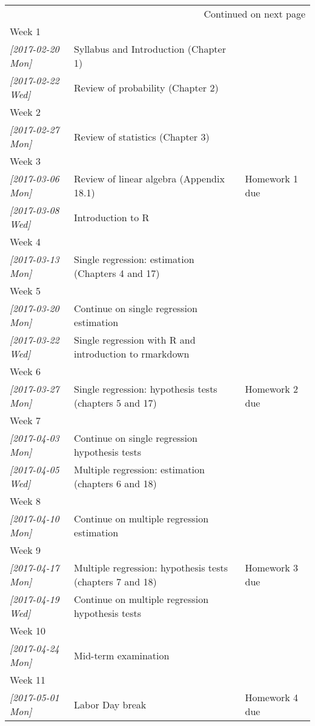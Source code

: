 \documentclass[a4paper,11pt]{article}
\begin{document}
{\begin{longtable}{p{2.8cm}p{9cm}p{2.8cm}}
\hline
\endhead
\hline\multicolumn{3}{r}{Continued on next page} \\
\endfoot
\endlastfoot
\hline
Week 1 &  & \\
\textit{[2017-02-20 Mon]} & Syllabus and Introduction (Chapter 1) & \\
\textit{[2017-02-22 Wed]} & Review of probability (Chapter 2) & \\
\hline
Week 2 &  & \\
\textit{[2017-02-27 Mon]} & Review of statistics (Chapter 3) & \\
\hline
Week 3 &  & \\
\textit{[2017-03-06 Mon]} & Review of linear algebra (Appendix 18.1) & Homework 1 due\\
\textit{[2017-03-08 Wed]} & Introduction to R & \\
\hline
Week 4 &  & \\
\textit{[2017-03-13 Mon]} & Single regression: estimation (Chapters 4 and 17) & \\
\hline
Week 5 &  & \\
\textit{[2017-03-20 Mon]} & Continue on single regression estimation & \\
\textit{[2017-03-22 Wed]} & Single regression with R and introduction to rmarkdown & \\
\hline
Week 6 &  & \\
\textit{[2017-03-27 Mon]} & Single regression: hypothesis tests (chapters 5 and 17) & Homework 2 due\\
\hline
Week 7 &  & \\
\textit{[2017-04-03 Mon]} & Continue on single regression hypothesis tests & \\
\textit{[2017-04-05 Wed]} & Multiple regression: estimation (chapters 6 and 18) & \\
\hline
Week 8 &  & \\
\textit{[2017-04-10 Mon]} & Continue on multiple regression estimation & \\
\hline
Week 9 &  & \\
\textit{[2017-04-17 Mon]} & Multiple regression: hypothesis tests (chapters 7 and 18) & Homework 3 due\\
\textit{[2017-04-19 Wed]} & Continue on multiple regression hypothesis tests & \\
\hline
Week 10 &  & \\
\textit{[2017-04-24 Mon]} & Mid-term examination & \\
\hline
Week 11 &  & \\
\textit{[2017-05-01 Mon]} & Labor Day break & Homework 4 due\\

\end{longtable}}
\end{document}
